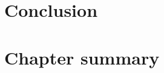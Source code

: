      
     
     
     
        
        
     
     
     



\section{Conclusion}

\section{Chapter summary}






















